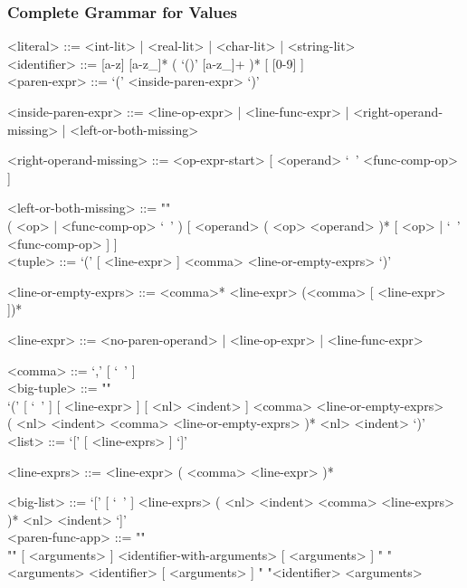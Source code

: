 \documentclass{article}
\begin{document}
\subsubsection{Complete Grammar for Values}
\begin{grammar}

<literal> ::= <int-lit> | <real-lit> | <char-lit> | <string-lit>
\\

<identifier> ::= [a-z] [a-z_]* ( `()' [a-z_]+ )* [ [0-9] ]
\\

<paren-expr> ::= `(' <inside-paren-expr> `)'  

<inside-paren-expr> ::= 
<line-op-expr> | <line-func-expr> | <right-operand-missing> | <left-or-both-missing>

<right-operand-missing> ::= <op-expr-start> [ <operand> `\ ' <func-comp-op> ]

<left-or-both-missing> ::= ""\\
( <op> | <func-comp-op> `\ ' )
[ <operand> ( <op> <operand> )* [ <op> | `\ ' <func-comp-op> ] ]
\\

<tuple> ::= `(' [ <line-expr> ] <comma> <line-or-empty-exprs> `)'

<line-or-empty-exprs> ::=
<comma>* <line-expr> (<comma> [ <line-expr> ])*

<line-expr> ::= <no-paren-operand> | <line-op-expr> | <line-func-expr>

<comma> ::= `,' [ `\ ' ]
\\

<big-tuple> ::= ""\\
`(' [ `\ ' ]  [ <line-expr> ] [ <nl> <indent> ] <comma> <line-or-empty-exprs> \\
( <nl> <indent> <comma> <line-or-empty-exprs> )* 
<nl> <indent> `)'
\\

<list> ::= `[' [ <line-exprs> ] `]'

<line-exprs> ::= <line-expr> ( <comma> <line-expr> )*

<big-list> ::= 
`[' [ `\ ' ] <line-exprs> ( <nl> <indent> <comma> <line-exprs> )* <nl> <indent> `]'
\\

<paren-func-app> ::= ""\\""
[ <arguments> ] <identifier-with-arguments> [ <arguments> ]
\alt " "<arguments> <identifier> [ <arguments> ]
\alt " "<identifier> <arguments>


\end{grammar}
\end{document}
